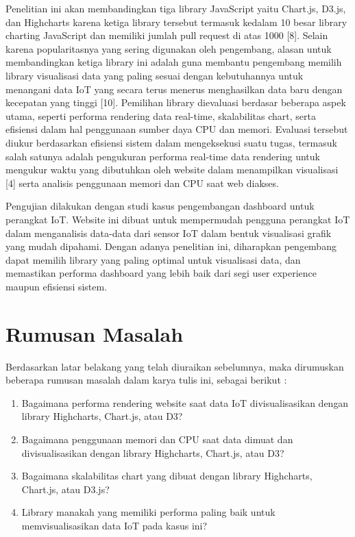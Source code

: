 Penelitian ini  akan membandingkan tiga library JavaScript yaitu Chart.js, D3.js, dan Highcharts karena ketiga library tersebut termasuk kedalam 10 besar library charting JavaScript dan memiliki jumlah pull request di atas 1000 [8]. Selain karena popularitasnya yang sering digunakan oleh pengembang, alasan untuk membandingkan ketiga library ini adalah guna membantu pengembang memilih library visualisasi data yang paling sesuai dengan kebutuhannya untuk menangani data IoT yang secara terus menerus menghasilkan data baru dengan kecepatan yang tinggi [10]. Pemilihan library dievaluasi berdasar beberapa aspek utama, seperti performa rendering data real-time, skalabilitas chart, serta efisiensi dalam hal penggunaan sumber daya CPU dan memori. Evaluasi tersebut diukur berdasarkan efisiensi sistem dalam mengeksekusi suatu tugas, termasuk salah satunya adalah pengukuran performa real-time data rendering untuk mengukur waktu yang dibutuhkan oleh website dalam menampilkan visualisasi [4] serta analisis penggunaan memori dan CPU saat web diakses.

Pengujian dilakukan dengan studi kasus pengembangan dashboard untuk perangkat IoT. Website ini dibuat untuk mempermudah pengguna perangkat IoT dalam menganalisis data-data dari sensor IoT dalam bentuk visualisasi grafik yang mudah dipahami. Dengan adanya penelitian ini, diharapkan pengembang dapat memilih library yang paling optimal untuk visualisasi data, dan memastikan performa dashboard yang lebih baik dari segi user experience maupun efisiensi sistem.

\section{Rumusan Masalah}
Berdasarkan latar belakang yang telah diuraikan sebelumnya, maka dirumuskan beberapa rumusan masalah dalam karya tulis ini, sebagai berikut :
\begin{enumerate}
    \item Bagaimana performa rendering website saat data IoT divisualisasikan dengan library Highcharts, Chart.js, atau D3? 
    \item Bagaimana penggunaan memori dan CPU saat data dimuat dan divisualisasikan dengan library Highcharts, Chart.js, atau D3? 
    \item Bagaimana skalabilitas chart yang dibuat dengan library Highcharts, Chart.js, atau D3.js? 
    \item Library manakah yang memiliki performa paling baik untuk memvisualisasikan data IoT pada kasus ini? 
\end{enumerate}

